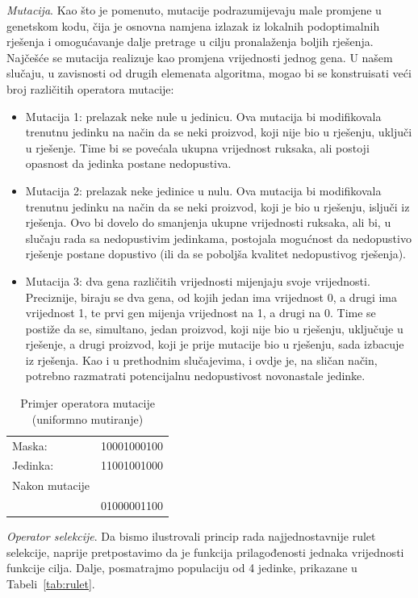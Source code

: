 \documentclass[a4paper, utf8, 11pt, colorlinks]{book}
\begin{document}
\emph{Mutacija}. Kao što je pomenuto, mutacije podrazumijevaju male promjene u genetskom kodu, čija je osnovna namjena izlazak iz lokalnih podoptimalnih rješenja i omogućavanje dalje pretrage u cilju pronalaženja boljih rješenja. Najčešće se mutacija realizuje kao promjena vrijednosti jednog gena. U našem slučaju, u zavisnosti od drugih elemenata algoritma, mogao bi se konstruisati veći broj različitih operatora mutacije: 
\begin{itemize}
	\item Mutacija 1: prelazak neke nule u jedinicu. Ova mutacija bi modifikovala trenutnu jedinku na način da se neki proizvod, koji nije bio u rješenju, uključi u rješenje. Time bi se povećala ukupna vrijednost ruksaka, ali postoji opasnost da jedinka postane nedopustiva.
	\item  Mutacija 2: prelazak neke jedinice u nulu. Ova mutacija bi modifikovala trenutnu jedinku na način da se neki proizvod, koji je bio u rješenju, isljuči iz rješenja. Ovo bi dovelo do smanjenja ukupne vrijednosti ruksaka, ali bi, u slučaju rada sa nedopustivim jedinkama, postojala mogućnost da nedopustivo rješenje postane dopustivo (ili da se poboljša kvalitet nedopustivog rješenja).
	\item  Mutacija 3: dva gena različitih vrijednosti mijenjaju svoje vrijednosti. Preciznije, biraju se dva gena, od kojih jedan ima vrijednost 0, a drugi ima vrijednost 1, te prvi gen mijenja vrijednost na 1, a drugi na 0. Time se postiže da se, simultano, jedan proizvod, koji nije bio u rješenju, uključuje u rješenje, a drugi proizvod, koji je prije mutacije bio u rješenju, sada izbacuje iz rješenja. Kao i u prethodnim slučajevima, i ovdje je, na sličan način, potrebno razmatrati potencijalnu nedopustivost novonastale jedinke.
\end{itemize}

\begin{table}[H]
	\centering
	\begin{tabular}{lc}
		Maska:  & 10001000100  \\
		Jedinka: & 11001001000  \\ \hline
		Nakon mutacije &       \\
		               & 01000001100      \\
	\end{tabular}	
	\caption{Primjer operatora mutacije (uniformno mutiranje)}
\end{table}

\emph{Operator selekcije}. Da bismo ilustrovali princip rada najjednostavnije rulet selekcije, naprije pretpostavimo da je funkcija prilagođenosti jednaka vrijednosti funkcije cilja. Dalje, posmatrajmo populaciju od 4 jedinke, prikazane u Tabeli~\ref{tab:rulet}.
\end{document}
